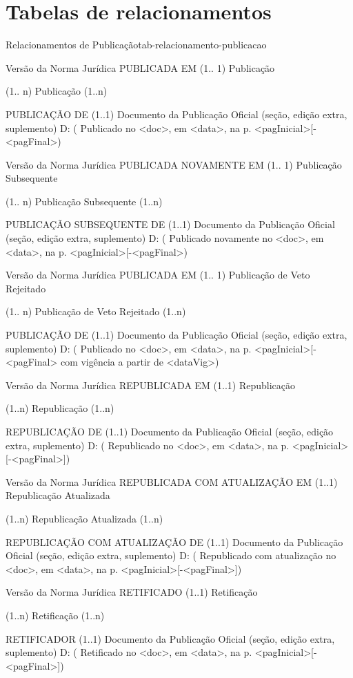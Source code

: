 \chapter{Tabelas de relacionamentos}
\label{apendices_tabelas_relacionamentos}

\newcommand{\mypar}{\par}

\begin{tabelarelacionamento}{Relacionamentos
de Publicação}{tab-relacionamento-publicacao}

 \relacionamento
 	{Versão da Norma Jurídica}
 	{PUBLICADA EM (1.. 1)}
 	{Publicação}
 	{(1.. n) Publicação (1..n) 
 	 \mypar 
 	 [ data, edição, \{ pagina, coluna \} inicial e final]}
 	{PUBLICAÇÃO DE (1..1)}
 	{Documento da Publicação Oficial (seção, edição extra, suplemento)}
 	{D: ( Publicado no <doc>, em <data>, na p. <pagInicial>[-<pagFinal>)}
 	
 \relacionamento
 	{Versão da Norma Jurídica}
 	{PUBLICADA NOVAMENTE EM (1.. 1)}
 	{Publicação Subsequente}
 	{(1.. n) Publicação Subsequente (1..n) 
 	 \mypar 
 	 [ data, edição, \{ pagina, coluna \} inicial e final ]}
 	{PUBLICAÇÃO SUBSEQUENTE DE (1..1)}
 	{Documento da Publicação Oficial (seção, edição extra, suplemento)}
 	{D: ( Publicado novamente no <doc>, em <data>, na p. <pagInicial>[-<pagFinal>)}
 	
 \relacionamento
 	{Versão da Norma Jurídica}
 	{PUBLICADA EM (1.. 1)}
 	{Publicação de Veto Rejeitado}
 	{(1.. n) Publicação de Veto Rejeitado (1..n)
 	 \mypar 
 	 [ data, edição, \{ pagina, coluna \} inicial e final, dataIniVigencia ]}
 	{PUBLICAÇÃO DE (1..1)}
 	{Documento da Publicação Oficial (seção, edição extra, suplemento)}
 	{D: ( Publicado no <doc>, em <data>, na p. <pagInicial>[-<pagFinal> com vigência a partir de <dataVig>)}
 	
 \relacionamento
 	{Versão da Norma Jurídica}
 	{REPUBLICADA EM (1..1)}
 	{Republicação}
 	{(1..n) Republicação (1..n)
 	 \mypar 
 	 [ data, edição, \{pagina, coluna\} inicial e final ]}
 	{REPUBLICAÇÃO DE (1..1)}
 	{Documento da Publicação Oficial (seção, edição extra, suplemento)}
 	{D: ( Republicado no <doc>, em <data>, na p. <pagInicial>[-<pagFinal>])}
 	
 \relacionamento
 	{Versão da Norma Jurídica}
 	{REPUBLICADA COM ATUALIZAÇÃO EM (1..1)}
 	{Republicação Atualizada}
 	{(1..n) Republicação Atualizada (1..n)
 	 \mypar 
 	 [ data, edição, \{pagina, coluna\} inicial e final ]}
 	{REPUBLICAÇÃO COM ATUALIZAÇÃO DE (1..1)}
 	{Documento da Publicação Oficial (seção, edição extra, suplemento)}
 	{D: ( Republicado com atualização no <doc>, em <data>, na p. <pagInicial>[-<pagFinal>])}
 	
 \relacionamento
 	{Versão da Norma Jurídica}
 	{RETIFICADO (1..1)}
 	{Retificação}
 	{(1..n) Retificação (1..n)
 	 \mypar 
 	 [ data, edição, \{pagina, coluna\} inicial e final ]}
 	{RETIFICADOR (1..1)}
 	{Documento da Publicação Oficial (seção, edição extra, suplemento)}
 	{D: ( Retificado no <doc>, em <data>, na p. <pagInicial>[-<pagFinal>])}

\end{tabelarelacionamento}

